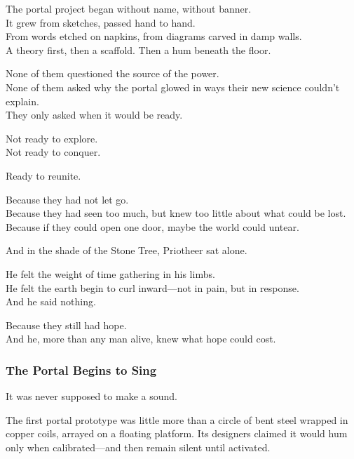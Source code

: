 \documentclass[12pt]{article}
\begin{document}
\vspace{0.5em}
The portal project began without name, without banner.\\
It grew from sketches, passed hand to hand.\\
From words etched on napkins, from diagrams carved in damp walls.\\
A theory first, then a scaffold. Then a hum beneath the floor.

\vspace{0.5em}
None of them questioned the source of the power.\\
None of them asked why the portal glowed in ways their new science couldn’t explain.\\
They only asked when it would be ready.

\vspace{0.5em}
Not ready to explore.\\
Not ready to conquer.

\vspace{0.5em}
Ready to reunite.

\vspace{0.5em}
Because they had not let go.\\
Because they had seen too much, but knew too little about what could be lost.\\
Because if they could open one door, maybe the world could untear.

\vspace{0.5em}
And in the shade of the Stone Tree, Priotheer sat alone.

\vspace{0.5em}
He felt the weight of time gathering in his limbs.\\
He felt the earth begin to curl inward---not in pain, but in response.\\
And he said nothing.

\vspace{0.5em}
Because they still had hope.\\
And he, more than any man alive, knew what hope could cost.


\dotfill


\subsubsection{The Portal Begins to Sing}

It was never supposed to make a sound.

\vspace{0.5em}
The first portal prototype was little more than a circle of bent steel wrapped in copper coils, arrayed on a floating platform. Its designers claimed it would hum only when calibrated---and then remain silent until activated.
\end{document}
